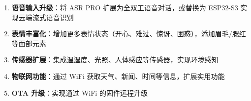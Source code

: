 \documentclass[12pt,a4paper]{ctexart}
\begin{document}
\begin{enumerate}
    \item \textbf{语音输入升级}：将 ASR PRO 扩展为全双工语音对话，或替换为 ESP32-S3 实现云端流式语音识别
    \item \textbf{表情丰富化}：增加更多表情状态（开心、难过、惊讶、困惑），添加眉毛/腮红等面部元素
    \item \textbf{传感器扩展}：集成温湿度、光照、人体感应等传感器，实现环境感知
    \item \textbf{物联网功能}：通过 WiFi 获取天气、新闻、时间等信息，扩展实用功能
    \item \textbf{OTA 升级}：实现通过 WiFi 的固件远程升级
\end{enumerate}
\end{document}
